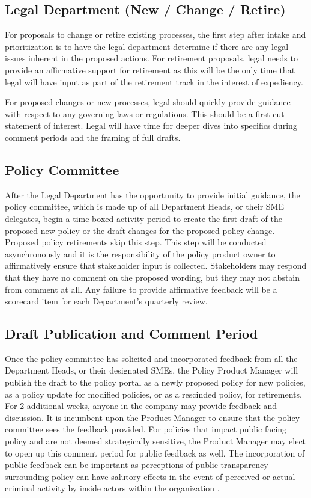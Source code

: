 \documentclass[stu]{apa7}
\begin{document}
\subsection{Legal Department (New / Change / Retire)}
\label{sec:org46ffb5d}

For proposals to change or retire existing processes, the first step after intake and prioritization is to have the legal department determine if there are any legal issues inherent in the proposed actions. For retirement proposals, legal needs to provide an affirmative support for retirement as this will be the only time that legal will have input as part of the retirement track in the interest of expediency.

For proposed changes or new processes, legal should quickly provide guidance with respect to any governing laws or regulations. This should be a first cut statement of interest. Legal will have time for deeper dives into specifics during comment periods and the framing of full drafts.

\subsection{Policy Committee}
\label{sec:org4f36616}

After the Legal Department has the opportunity to provide initial guidance, the policy committee, which is made up of all Department Heads, or their SME delegates, begin a time-boxed activity period to create the first draft of the proposed new policy or the draft changes for the proposed policy change. Proposed policy retirements skip this step. This step will be conducted asynchronously and it is the responsibility of the policy product owner to affirmatively ensure that stakeholder input is collected. Stakeholders may respond that they have no comment on the proposed wording, but they may not abstain from comment at all. Any failure to provide affirmative feedback will be a scorecard item for each Department's quarterly review.

\subsection{Draft Publication and Comment Period}
\label{sec:org969f701}

Once the policy committee has solicited and incorporated feedback from all the Department Heads, or their designated SMEs, the Policy Product Manager will publish the draft to the policy portal as a newly proposed policy for new policies, as a policy update for modified policies, or as a rescinded policy, for retirements. For 2 additional weeks, anyone in the company may provide feedback and discussion. It is incumbent upon the Product Manager to ensure that the policy committee sees the feedback provided. For policies that impact public facing policy and are not deemed strategically sensitive, the Product Manager may elect to open up this comment period for public feedback as well. The incorporation of public feedback can be important as perceptions of public transparency surrounding policy can have salutory effects in the event of perceived or actual criminal activity by inside actors within the organization \citep{jonssonRiskyBusinessCorporate2019}.
\end{document}
